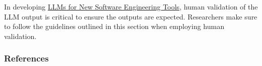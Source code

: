 In developing \href{/study-types/#llms-for-new-software-engineering-tools}{LLMs for New Software Engineering Tools}, human validation of the LLM output is critical to ensure the outputs are expected.
Researchers \should make sure to follow the guidelines outlined in this section when employing human validation.

\subsubsection{References}





